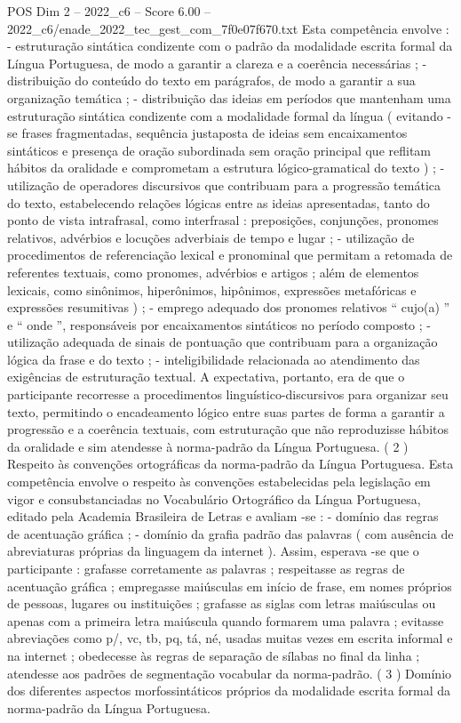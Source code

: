 \begin{textsample}{POS Dim 2 – 2022\_c6 – Score 6.00 – 2022\_c6/enade\_2022\_tec\_gest\_com\_7f0e07f670.txt}
Esta competência envolve : - estruturação sintática condizente com o padrão da modalidade escrita formal da Língua Portuguesa, de modo a garantir a clareza e a coerência necessárias ; - distribuição do conteúdo do texto em parágrafos, de modo a garantir a sua organização temática ; - distribuição das ideias em períodos que mantenham uma estruturação sintática condizente com a modalidade formal da língua ( evitando -se frases fragmentadas, sequência justaposta de ideias sem encaixamentos sintáticos e presença de oração subordinada sem oração principal que reflitam hábitos da oralidade e comprometam a estrutura lógico-gramatical do texto ) ; - utilização de operadores discursivos que contribuam para a progressão temática do texto, estabelecendo relações lógicas entre as ideias apresentadas, tanto do ponto de vista intrafrasal, como interfrasal : preposições, conjunções, pronomes relativos, advérbios e locuções adverbiais de tempo e lugar ; - utilização de procedimentos de referenciação lexical e pronominal que permitam a retomada de referentes textuais, como pronomes, advérbios e artigos ; além de elementos lexicais, como sinônimos, hiperônimos, hipônimos, expressões metafóricas e expressões resumitivas ) ; - emprego adequado dos pronomes relativos “ cujo(a) ” e “ onde ”, responsáveis por encaixamentos sintáticos no período composto ; - utilização adequada de sinais de pontuação que contribuam para a organização lógica da frase e do texto ; - inteligibilidade relacionada ao atendimento das exigências de estruturação textual.
A expectativa, portanto, era de que o participante recorresse a procedimentos linguístico-discursivos para organizar seu texto, permitindo o encadeamento lógico entre suas partes de forma a garantir a progressão e a coerência textuais, com estruturação que não reproduzisse hábitos da oralidade e sim atendesse à norma-padrão da Língua Portuguesa. ( 2 ) Respeito às convenções ortográficas da norma-padrão da Língua Portuguesa.
Esta competência envolve o respeito às convenções estabelecidas pela legislação em vigor e consubstanciadas no Vocabulário Ortográfico da Língua Portuguesa, editado pela Academia Brasileira de Letras e avaliam -se : - domínio das regras de acentuação gráfica ; - domínio da grafia padrão das palavras ( com ausência de abreviaturas próprias da linguagem da internet ).
Assim, esperava -se que o participante : grafasse corretamente as palavras ; respeitasse as regras de acentuação gráfica ; empregasse maiúsculas em início de frase, em nomes próprios de pessoas, lugares ou instituições ; grafasse as siglas com letras maiúsculas ou apenas com a primeira letra maiúscula quando formarem uma palavra ; evitasse abreviações como p/, vc, tb, pq, tá, né, usadas muitas vezes em escrita informal e na internet ; obedecesse às regras de separação de sílabas no final da linha ; atendesse aos padrões de segmentação vocabular da norma-padrão. ( 3 ) Domínio dos diferentes aspectos morfossintáticos próprios da modalidade escrita formal da norma-padrão da Língua Portuguesa.

\end{textsample}
